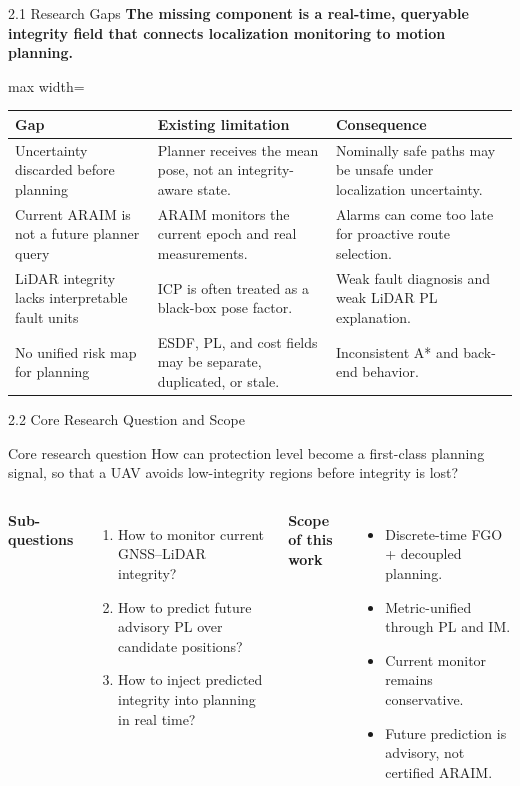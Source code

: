 \documentclass[10pt,aspectratio=169,xcolor=dvipsnames]{beamer}
\newcommand{\tightitem}{\setlength{\itemsep}{2pt}\setlength{\parskip}{0pt}\setlength{\parsep}{0pt}}
\newcommand{\smalltable}[1]{\begin{adjustbox}{max width=\linewidth}\scriptsize#1\end{adjustbox}}
\begin{document}
\begin{frame}[t]{2.1 Research Gaps}
  \small
  \textbf{The missing component is a real-time, queryable integrity field that connects localization monitoring to motion planning.}
  \vspace{8mm}
  
  \smalltable{%
    \begin{tabular}{p{}p{0.34\textwidth}p{0.34\textwidth}}
      \toprule
      \textbf{Gap} & \textbf{Existing limitation} & \textbf{Consequence}\\
      \midrule
      Uncertainty discarded before planning & Planner receives the mean pose, not an integrity-aware state. & Nominally safe paths may be unsafe under localization uncertainty.\\
      Current ARAIM is not a future planner query & ARAIM monitors the current epoch and real measurements. & Alarms can come too late for proactive route selection.\\
      LiDAR integrity lacks interpretable fault units & ICP is often treated as a black-box pose factor. & Weak fault diagnosis and weak LiDAR PL explanation.\\
      No unified risk map for planning & ESDF, PL, and cost fields may be separate, duplicated, or stale. & Inconsistent A* and back-end behavior.\\
      \bottomrule
  \end{tabular}}
\end{frame}

\begin{frame}[t]{2.2 Core Research Question and Scope}
  \small
  \begin{block}{Core research question}
    How can protection level become a first-class planning signal, so that a UAV avoids low-integrity regions before integrity is lost?
  \end{block}
  \begin{columns}[T]
    \textbf{Sub-questions}
    \begin{enumerate}\tightitem
      \item How to monitor current GNSS--LiDAR integrity?
      \item How to predict future advisory PL over candidate positions?
      \item How to inject predicted integrity into planning in real time?
    \end{enumerate}

    \textbf{Scope of this work}
    \begin{itemize}\tightitem
      \item Discrete-time FGO + decoupled planning.
      \item Metric-unified through PL and IM.
      \item Current monitor remains conservative.
      \item Future prediction is advisory, not certified ARAIM.
    \end{itemize}
  \end{columns}
\end{frame}
\end{document}
